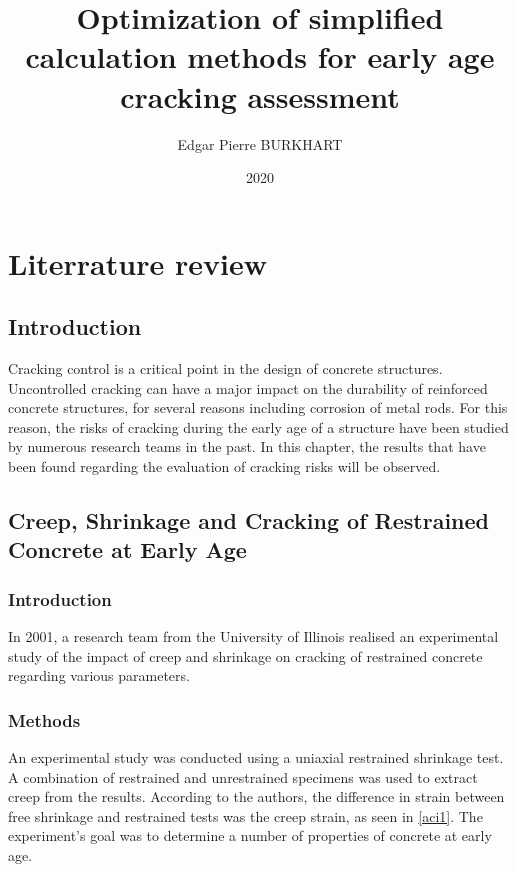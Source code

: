 \documentclass{report}
\title{Optimization of simplified calculation methods for early age cracking assessment}
\author{Edgar Pierre BURKHART}
\date{2020}
\begin{document}
\maketitle

\tableofcontents


\chapter{Literrature review}

\section{Introduction}

Cracking control is a critical point in the design of concrete structures.
Uncontrolled cracking can have a major impact on the durability of reinforced
concrete structures, for several reasons including corrosion of metal rods.
For this reason, the risks of cracking during the early age of a structure have
been studied by numerous research teams in the past. In this chapter, the
results that have been found regarding the evaluation of cracking risks will be
observed.

\section[Creep, Shrinkage and Cracking of Restrained Concrete at Early Age]
{Creep, Shrinkage and Cracking of Restrained Concrete at Early Age
\cite{cscea}}
\subsection{Introduction}
In 2001, a research team from the University of Illinois realised an
experimental study of the impact of creep and shrinkage on cracking of
restrained concrete regarding various parameters.

\subsection{Methods}
An experimental study was conducted using a uniaxial restrained shrinkage test.
A combination of restrained and unrestrained specimens was used to extract
creep from the results. According to the authors, the difference in strain
between free shrinkage and restrained tests was the creep strain, as seen in
\autoref{aci1}. The experiment's goal was to determine a number of properties
of concrete at early age.
\end{document}
